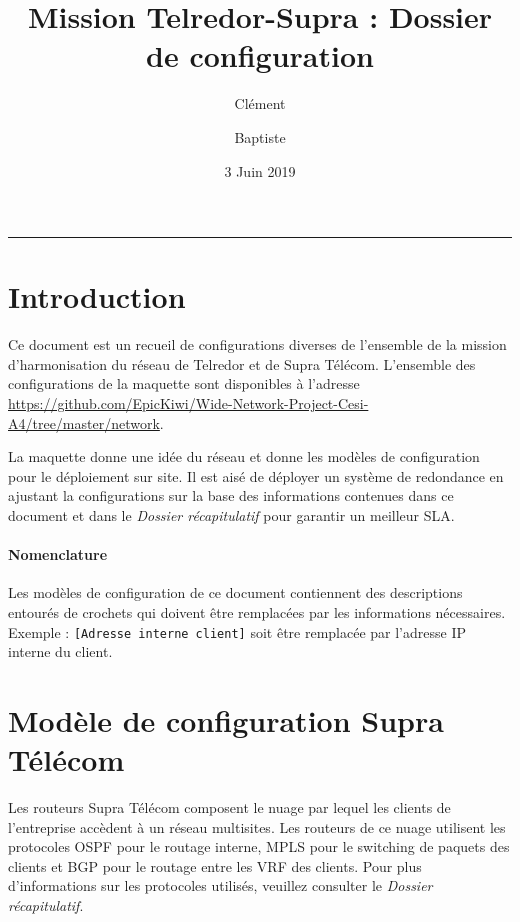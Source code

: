 \documentclass{article}
\title{Mission Telredor-Supra : Dossier de configuration}
\date{3 Juin 2019}
\author{Clément \bsc{Boutin} \and Baptiste \bsc{Saclier}}
\newcommand{\tlr}{Telredor\xspace}
\newcommand{\spr}{Supra Télécom\xspace}
\begin{document}
\maketitle

\begin{center}
\rule{0.5\textwidth}{0.4pt}
\end{center}

\bigskip



\bigskip

\tableofcontents

\section{Introduction}

Ce document est un recueil de configurations diverses de l'ensemble de la mission d'harmonisation du réseau de \tlr et de \spr.
L'ensemble des configurations de la maquette sont disponibles à l'adresse \url{https://github.com/EpicKiwi/Wide-Network-Project-Cesi-A4/tree/master/network}.

\medskip

La maquette donne une idée du réseau et donne les modèles de configuration pour le déploiement sur site.
Il est aisé de déployer un système de redondance en ajustant la configurations sur la base des informations contenues dans ce document et dans le \emph{Dossier récapitulatif} pour garantir un meilleur SLA.

\paragraph{Nomenclature} Les modèles de configuration de ce document contiennent des descriptions entourés de crochets qui doivent être remplacées par les informations nécessaires.
Exemple : \texttt{\color{PineGreen}[Adresse interne client]} soit être remplacée par l'adresse IP interne du client.

\section{Modèle de configuration \spr}

Les routeurs \spr composent le nuage par lequel les clients de l'entreprise accèdent à un réseau multisites.
Les routeurs de ce nuage utilisent les protocoles OSPF pour le routage interne, MPLS pour le switching de paquets des clients et BGP pour le routage entre les VRF des clients.
Pour plus d'informations sur les protocoles utilisés, veuillez consulter le \emph{Dossier récapitulatif}.
\end{document}
